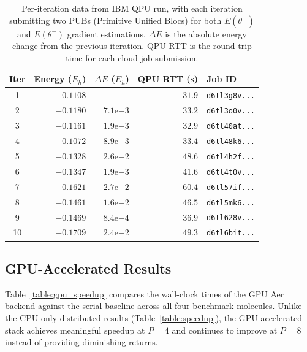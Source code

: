 \begin{table}[htbp]
\centering
\renewcommand{\arraystretch}{1.2}
\caption{Per-iteration data from IBM QPU run, with each iteration submitting two PUBs (Primitive Unified Blocs) for both $E(\theta^+)$ and $E(\theta^-)$ gradient estimations. $\Delta E$ is the absolute energy change from the previous iteration. QPU RTT is the round-trip time for each cloud job submission.}
\label{table:ibm_iterations}
\begin{tabular}{|c|r|r|r|l|}
\hline          
\textbf{Iter} & \textbf{Energy ($E_h$)} & \textbf{$\Delta E$ ($E_h$)} & \textbf{QPU RTT (s)} & \textbf{Job ID} \\ \hline
1  & $-0.1108$ & ---      & $31.9$ & \texttt{d6tl3g8v...} \\ \hline
2  & $-0.1180$ & $7.1\mathrm{e}{-3}$  & $33.2$ & \texttt{d6tl3o0v...} \\ \hline
3  & $-0.1161$ & $1.9\mathrm{e}{-3}$  & $32.9$ & \texttt{d6tl40at...} \\ \hline
4  & $-0.1072$ & $8.9\mathrm{e}{-3}$  & $33.4$ & \texttt{d6tl48k6...} \\ \hline
5  & $-0.1328$ & $2.6\mathrm{e}{-2}$  & $48.6$ & \texttt{d6tl4h2f...} \\ \hline
6  & $-0.1347$ & $1.9\mathrm{e}{-3}$  & $41.6$ & \texttt{d6tl4t0v...} \\ \hline
7  & $-0.1621$ & $2.7\mathrm{e}{-2}$  & $60.4$ & \texttt{d6tl57if...} \\ \hline
8  & $-0.1461$ & $1.6\mathrm{e}{-2}$  & $46.5$ & \texttt{d6tl5mk6...} \\ \hline
9  & $-0.1469$ & $8.4\mathrm{e}{-4}$  & $36.9$ & \texttt{d6tl628v...} \\ \hline
10 & $-0.1709$ & $2.4\mathrm{e}{-2}$  & $49.3$ & \texttt{d6tl6bit...} \\ \hline       
\end{tabular}
\end{table}

\subsection{GPU-Accelerated Results}
\label{sec:gpu_results}

Table~\ref{table:gpu_speedup} compares the wall-clock times of the GPU Aer backend against the serial baseline 
across all four benchmark molecules. Unlike the CPU only distributed results (Table~\ref{table:speedup}), 
the GPU accelerated stack achieves meaningful speedup at $P=4$ and continues to improve at $P=8$ instead of providing diminishing returns.

